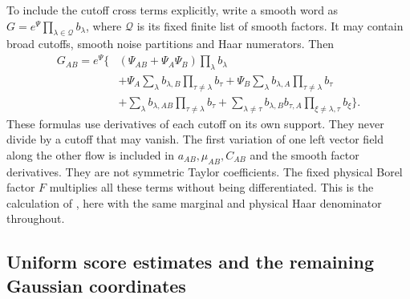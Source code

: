 \documentclass[11pt,reqno]{amsart}
\numberwithin{equation}{section}
\theoremstyle{definition}
\theoremstyle{remark}
\begin{document}
To include the cutoff cross terms explicitly, write a smooth
word as \(G=e^\Psi\prod_{\lambda\in\mathcal Q}b_\lambda\),
where \(\mathcal Q\) is its fixed finite list of smooth factors.
It may contain broad cutoffs, smooth noise partitions and Haar
numerators. Then
\begin{equation}
 \begin{split}
 G_{AB}=e^\Psi\bigg\{&
  (\Psi_{AB}+\Psi_A\Psi_B)\prod_\lambda b_\lambda\\
 &+\Psi_A\sum_\lambda b_{\lambda,B}\prod_{\tau\ne\lambda}b_\tau
  +\Psi_B\sum_\lambda b_{\lambda,A}\prod_{\tau\ne\lambda}b_\tau\\
 &+\sum_\lambda b_{\lambda,AB}\prod_{\tau\ne\lambda}b_\tau
  +\sum_{\lambda\ne\tau}b_{\lambda,B}b_{\tau,A}
                          \prod_{\xi\ne\lambda,\tau}b_\xi\bigg\}.
 \end{split}
 \label{eq:output-smooth-word-second-variation}
\end{equation}
These formulas use derivatives of each cutoff on its own
support. They never divide by a cutoff that may vanish.
The first variation of one left vector field along the other
flow is included in \(a_{AB},\mu_{AB},C_{AB}\) and the smooth
factor derivatives. They are not symmetric Taylor coefficients.
The fixed physical Borel factor \(F\) multiplies all these
terms without being differentiated. This is the calculation
of \cite[Section~31.3, pp.~189--191]{Main}, here with the same
marginal and physical Haar denominator throughout.

\subsection{Uniform score estimates and the remaining Gaussian coordinates}
\end{document}
